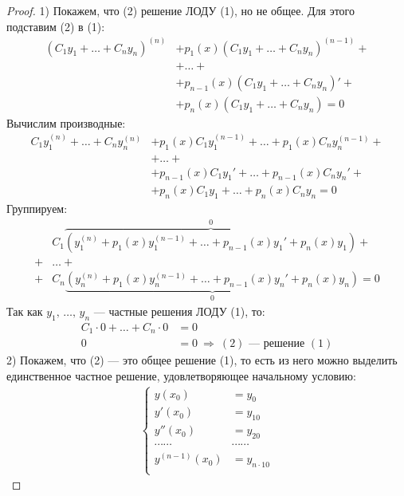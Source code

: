 \begin{proof}
    1) Покажем, что (2) решение ЛОДУ (1), но не общее. Для этого подставим (2) в (1):
    \begin{align*}
        \left(C_1y_1 + \ldots + C_ny_n\right)^{(n)} &+ p_1(x)\left(C_1y_1 + \ldots + C_ny_n\right)^{(n-1)} + \\ 
        &+ \ldots + \\ 
        &+ p_{n-1}(x) \left(C_1y_1 + \ldots + C_ny_n\right)' + \\ 
        &+ p_{n}(x) \left(C_1y_1 + \ldots + C_ny_n\right) = 0
    \end{align*}
    Вычислим производные:
    \begin{align*}
        C_1y_1^{(n)} + \ldots + C_ny_n^{(n)} &+ p_1(x) C_1y_1^{(n-1)} + \ldots + p_1(x)C_ny_n^{(n-1)} + \\ 
        &+ \ldots + \\ 
        &+ p_{n-1}(x) C_1y_1' + \ldots + p_{n-1}(x)C_ny_n' + \\ 
        &+ p_{n}(x) C_1y_1 + \ldots + p_{n}(x)C_ny_n = 0
    \end{align*} \vspace{-0.5\topsep}
    Группируем:
    \begin{align*}
        &C_1\overbrace{\left(y_1^{(n)} + p_1(x)y_1^{(n-1)} + \ldots + p_{n-1}(x)y_1' + p_n(x) y_1\right)}^0 + \\ 
        + &\ldots + \\ 
        + &C_n\underbrace{\left(y_n^{(n)} + p_1(x)y_n^{(n-1)} + \ldots + p_{n-1}(x)y_n' + p_n(x) y_n\right)}_0 = 0
    \end{align*}
    Так как $y_1,\, \ldots,\, y_n$ --- частные решения ЛОДУ (1), то:
    \begin{align*}
        C_1\cdot 0 + \ldots + C_n \cdot 0 &= 0 \\
        0 &= 0\ \Rightarrow\ (2)\text{ --- решение } (1)
    \end{align*}
    2) Покажем, что (2) --- это общее решение (1), то есть из него можно выделить единственное частное решение, удовлетворяющее начальному условию:
    \begin{align*}
        \left\{ \begin{aligned}
            y(x_0) &= y_0 \\
            y'(x_0) &= y_{10} \\
            y''(x_0) &= y_{20} \\
            \cdots\cdots&\cdots\cdots \\
            y^{(n-1)}(x_0) &= y_{n\cdot10} \\

\end{aligned}
\end{align*}
\end{proof}
